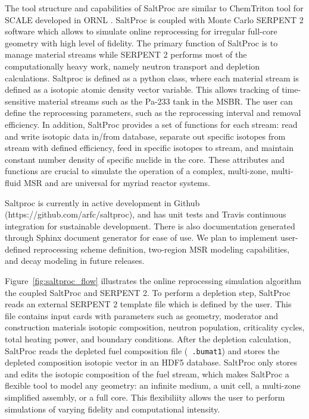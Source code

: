 The tool structure and capabilities of SaltProc are similar to ChemTriton tool for SCALE
developed in \gls{ORNL} \cite{powers_new_2013}. SaltProc is coupled with Monte Carlo SERPENT 2
software which allows to simulate online reprocessing for irregular full-core geometry with 
high level of fidelity.  The primary function of SaltProc is to manage material streams while
SERPENT 2 performs most of the computationally heavy work, namely neutron transport and depletion
calculations. Saltproc is defined as a 
python class, where each material stream is defined as a isotopic atomic density
vector variable. This allows tracking of time-sensitive material streams such as the
Pa-233 tank in the \gls{MSBR}. The user can define the reprocessing parameters, such as the 
reprocessing interval and removal efficiency.  In addition, SaltProc provides a set of functions 
for each stream: read and write isotopic data in/from database, separate out specific isotopes 
from stream with defined efficiency, feed in specific isotopes to stream, and maintain constant 
number density of specific nuclide in the core. These attributes and functions are crucial to 
simulate the operation of a complex, multi-zone, multi-fluid \gls{MSR} and are universal for 
myriad reactor systems.

Saltproc is currently in active development in Github (https://github.com/arfc/saltproc), and has unit tests and
Travis continuous integration for sustainable development. There is also documentation
generated through Sphinx document generator for ease of use. We plan to implement
user-defined reprocessing scheme definition, two-region \gls{MSR} modeling capabilities,
and decay modeling in future releases.

Figure~\ref{fig:saltproc_flow} illustrates the  online reprocessing simulation algorithm the 
coupled SaltProc and SERPENT 2. To perform a depletion step,
SaltProc reads an external SERPENT 2 template file which is defined by the user. This file 
contains input cards with parameters such as geometry,
moderator and construction materials isotopic composition, neutron population, criticality 
cycles, total heating power, and boundary conditions.
After the depletion calculation, SaltProc reads the depleted fuel composition file (\texttt{
.bumat1}) and stores the depleted
composition isotopic vector in an HDF5 database. SaltProc only stores and edits the isotopic 
composition of the fuel stream,
which makes SaltProc a flexible tool to model any geometry: an infinite medium, a unit cell, a 
multi-zone simplified assembly, or a full core.
This flexibiliity allows the user to perform simulations of varying fidelity and computational 
intensity.

